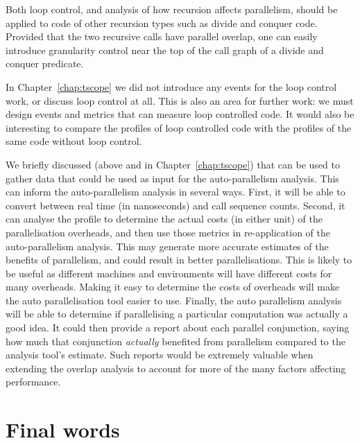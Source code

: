 Both loop control, and analysis of how recursion affects parallelism,
should be applied to code of other recursion types such as divide and
conquer code. 
Provided that the two recursive calls have parallel overlap,
one can easily introduce granularity control near the top of the call graph
of a divide and conquer predicate.


In Chapter~\ref{chap:tscope} we did not introduce any events for the loop
control work, or discuss loop control at all.
This is also an area for further work:
we must design events and metrics that can measure loop controlled code.
It would also be interesting to compare the profiles of loop controlled code
with the profiles of the same code without loop control.

We briefly discussed (above and in Chapter~\ref{chap:tscope}) that
\tscope can be used to gather data that could be used as input for the
auto-parallelism analysis.
This can inform the auto-parallelism analysis in several ways.
First, it will be able to convert between real time (in nanoseconds) and call
sequence counts.
Second, it can analyse the profile to determine the actual costs (in either
unit) of the parallelisation overheads,
and then use those metrics in re-application of the auto-parallelism
analysis.
This may generate more accurate estimates of the benefits of parallelism,
and could result in better parallelisations.
This is likely to be useful as different machines and environments will have
different costs for many overheads.
Making it easy to determine the costs of overheads will make the auto
parallelisation tool easier to use.
Finally, the auto parallelism analysis will be able to determine if
parallelising a particular computation was actually a good idea.
It could then provide a report about each parallel conjunction,
saying how much that conjunction \emph{actually} benefited from parallelism
compared to the analysis tool's estimate.
Such reports would be extremely valuable when extending the overlap analysis
to account for more of the many factors affecting performance.

\section{Final words}

